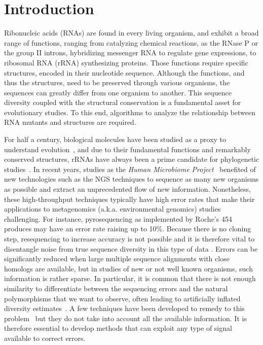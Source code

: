 \section{Introduction}
\label{sec:introduction}

Ribonucleic acids (RNAs) are found in every living organism, and exhibit a broad range of functions, ranging from catalyzing
chemical reactions, as the RNase P or the group II introns, hybridizing  messenger RNA to regulate gene expressions,
to ribosomal RNA (rRNA) synthesizing proteins. Those functions  require specific structures,  encoded in their nucleotide
sequence. Although the functions, and thus the structures, need to be preserved through various organisms, the sequences
can greatly differ from one organism to another. This sequence diversity coupled with the structural conservation is a fundamental
asset for evolutionary studies. To this end, algorithms to analyze the relationship between RNA mutants and structures are required.

For half a century, biological molecules have been studied as a proxy to understand evolution~\cite{Zuckerkandl1965}, and due
to their fundamental functions and remarkably conserved structures, rRNAs have always been a prime candidate for phylogenetic
studies~\cite{Olsen1986, Olsen1993}. In recent years, studies as the \emph{Human Microbiome Project}~\cite{Turnbaugh2007} benefited
of new technologies such as the NGS techniques to sequence as many new organisms as possible and extract an unprecedented flow of new information. 
Nonetheless, these high-throughput techniques typically have high error rates that make their applications to metagenomics (a.k.a. environmental
genomics) studies challenging. For instance, pyrosequencing as implemented by Roche's 454 produces may have an error rate raising up to 10\%.
Because there is no cloning step, resequencing to increase accuracy is not possible and it is therefore vital to disentangle noise from true sequence
diversity in this type of data \cite{Quince:2009uq}. Errors can be significantly reduced  when large multiple sequence alignments with close homologs
are available, but in studies of new or not well known organisms, such information is rather sparse. In particular, it is common that there is not enough  similarity to 
differentiate between the sequencing errors and the natural polymorphisms that we want to observe, often leading to artificially inflated diversity estimates~\cite{Kunin2010}.
A few techniques have been developed to remedy to this problem~\cite{Quinlan2008,Medvedev2011} but they do not take
into account all the available information. It is therefore essential to develop methods that can exploit any type of signal available to correct errors.  

